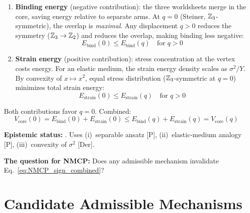 \begin{enumerate}
    \item \textbf{Binding energy} (negative contribution): the three
          worldsheets merge in the core, saving energy relative to
          separate arms. At $q = 0$ (Steiner, $\mathbb{Z}_3$-symmetric),
          the overlap is \emph{maximal}. Any displacement $q > 0$
          reduces the symmetry ($\mathbb{Z}_3 \to \mathbb{Z}_2$) and reduces the
          overlap, making binding less negative:
          \begin{equation}
              E_{\mathrm{bind}}(0) \leq E_{\mathrm{bind}}(q)
              \quad \text{for } q > 0
              \label{eq:NMCP_bind}
          \end{equation}

    \item \textbf{Strain energy} (positive contribution): stress
          concentration at the vertex costs energy. For an elastic
          medium, the strain energy density scales as $\sigma^2 / Y$.
          By convexity of $x \mapsto x^2$, equal stress distribution
          ($\mathbb{Z}_3$-symmetric at $q = 0$) minimizes total strain
          energy:
          \begin{equation}
              E_{\mathrm{strain}}(0) \leq E_{\mathrm{strain}}(q)
              \quad \text{for } q > 0
              \label{eq:NMCP_strain}
          \end{equation}
\end{enumerate}

Both contributions favor $q = 0$. Combined:
\begin{equation}
    V_{\mathrm{core}}(0) = E_{\mathrm{bind}}(0) + E_{\mathrm{strain}}(0)
    \leq E_{\mathrm{bind}}(q) + E_{\mathrm{strain}}(q)
    = V_{\mathrm{core}}(q)
    \label{eq:NMCP_sign_combined}
\end{equation}

\textbf{Epistemic status:} \tagDcI. Uses (i)~separable ansatz [P],
(ii)~elastic-medium analogy [P], (iii)~convexity of $\sigma^2$ [Der].

\textbf{The question for NMCP:} Does any admissible mechanism
invalidate Eq.~\eqref{eq:NMCP_sign_combined}?

\section{Candidate Admissible Mechanisms}
\label{sec:NMCP:candidates}

